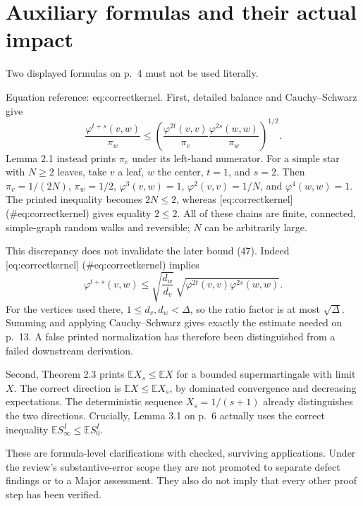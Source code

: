 \documentclass[10pt]{article}
\begin{document}
\section*{Auxiliary formulas and their actual impact}
Two displayed formulas on p. 4 must not be used literally.\par
Equation reference: eq:correctkernel. First, detailed balance and Cauchy–Schwarz give \[
 \frac{\varphi^{t+s}(v,w)}{\pi_w}
 \leq
 \left(\frac{\varphi^{2t}(v,v)}{\pi_v}
             \frac{\varphi^{2s}(w,w)}{\pi_w}\right)^{1/2}.\] Lemma 2.1 instead prints \(\pi_v\) under its left-hand numerator. For a simple star with \(N\geq2\) leaves, take \(v\) a leaf, \(w\) the center, \(t=1\), and \(s=2\). Then \(\pi_v=1/(2N)\), \(\pi_w=1/2\), \(\varphi^3(v,w)=1\), \(\varphi^2(v,v)=1/N\), and \(\varphi^4(w,w)=1\). The printed inequality becomes \(2N\leq2\), whereas [eq:correctkernel] (\#eq:correctkernel) gives equality \(2\leq2\). All of these chains are finite, connected, simple-graph random walks and reversible; \(N\) can be arbitrarily large.\par
This discrepancy does not invalidate the later bound (47). Indeed [eq:correctkernel] (\#eq:correctkernel) implies \[\varphi^{t+s}(v,w)\leq
 \sqrt{\frac{d_w}{d_v}}\,
 \sqrt{\varphi^{2t}(v,v)\varphi^{2s}(w,w)}.\] For the vertices used there, \(1\leq d_v,d_w<\Delta\), so the ratio factor is at most \(\sqrt{\Delta}\). Summing and applying Cauchy–Schwarz gives exactly the estimate needed on p. 13. A false printed normalization has therefore been distinguished from a failed downstream derivation.\par
Second, Theorem 2.3 prints \(\mathbb EX_s\leq \mathbb EX\) for a bounded supermartingale with limit \(X\). The correct direction is \(\mathbb EX\leq\mathbb EX_s\), by dominated convergence and decreasing expectations. The deterministic sequence \(X_s=1/(s+1)\) already distinguishes the two directions. Crucially, Lemma 3.1 on p. 6 actually uses the correct inequality \(\mathbb ES_\infty^I\leq\mathbb ES_0^I\).\par
These are formula-level clarifications with checked, surviving applications. Under the review’s substantive-error scope they are not promoted to separate defect findings or to a Major assessment. They also do not imply that every other proof step has been verified.\par
\end{document}
